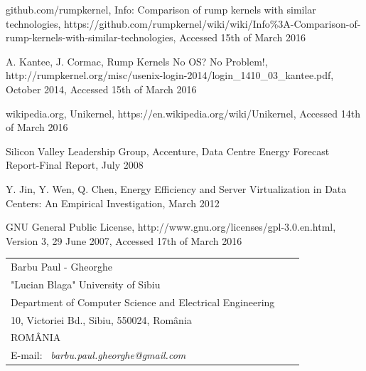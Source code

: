 \documentclass[10pt,a4paper,twoside]{article}
\begin{document}
\begin{thebibliography}{*}\label{Refences}
github.com/rumpkernel, \newblock Info: Comparison of rump kernels with similar technologies,
\newblock https://github.com/rumpkernel/wiki/wiki/Info\%3A-Comparison-of-rump-kernels-with-similar-technologies,
\newblock Accessed 15th of March 2016

\vspace{-7pt}
A. Kantee, J. Cormac, \newblock Rump Kernels No OS? No Problem!,
\newblock http://rumpkernel.org/misc/usenix-login-2014/login\_1410\_03\_kantee.pdf,
\newblock October 2014,
\newblock Accessed 15th of March 2016

\vspace{-7pt}
wikipedia.org, \newblock Unikernel,
\newblock https://en.wikipedia.org/wiki/Unikernel,
\newblock Accessed 14th of March 2016

\vspace{-7pt}
Silicon Valley Leadership Group, Accenture, \newblock
Data Centre Energy Forecast Report-Final Report, \newblock July 2008

\vspace{-7pt}
Y. Jin, Y. Wen, Q. Chen,
\newblock Energy Efficiency and Server Virtualization in Data Centers: An Empirical Investigation,
\newblock March 2012

GNU General Public License, \newblock http://www.gnu.org/licenses/gpl-3.0.en.html,
\newblock Version 3, 29 June 2007,
\newblock Accessed 17th of March 2016

\end{thebibliography}

\vspace*{1cm} {\footnotesize
\begin{tabular*}{16cm}{p{4.2cm}p{4.2cm}p{4.2cm}}
Barbu Paul - Gheorghe & \\
"Lucian Blaga" University of Sibiu & \\
Department of Computer Science and Electrical Engineering & \\
10, Victoriei Bd., Sibiu, 550024, Rom\^ania & \\
ROM\^ANIA & \\
E-mail: \ {\it barbu.paul.gheorghe@gmail.com}&
\end{tabular*}}
\end{document}
